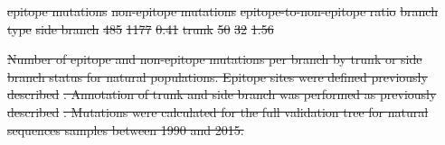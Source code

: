 \documentclass[9pt,lineno]{elife} %
\providecommand{\DIFdel}[1]{{\protect\color{red}\sout{#1}}}                      %
\providecommand{\DIFdelFL}[1]{\DIFdel{#1}} %
\providecommand{\DIFdeltex}[1]{{\protect\color{red}\sout{#1}}}                      %
\providecommand{\DIFdelFL}[1]{\DIFdel{#1}} %
\providecommand{\DIFdel}[1]{\texorpdfstring{\DIFdeltex{#1}}{}} %
\begin{document}
\DIFdelFL{epitope mutations }%
\DIFdelFL{non-epitope mutations }%
\DIFdelFL{epitope-to-non-epitope ratio }%
\DIFdelFL{branch type }%
\DIFdelFL{side branch }%
\DIFdelFL{485 }%
\DIFdelFL{1177 }%
\DIFdelFL{0.41 }%
\DIFdelFL{trunk       }%
\DIFdelFL{50 }%
\DIFdelFL{32 }%
\DIFdelFL{1.56 }%

{%
\DIFdelFL{Number of epitope and non-epitope mutations per branch by trunk or side branch status for natural populations.
    Epitope sites were defined previously described }%
\DIFdelFL{.
    Annotation of trunk and side branch was performed as previously described }%
\DIFdelFL{.
    Mutations were calculated for the full validation tree for natural sequences samples between 1990 and 2015.
    }}


\end{document}
